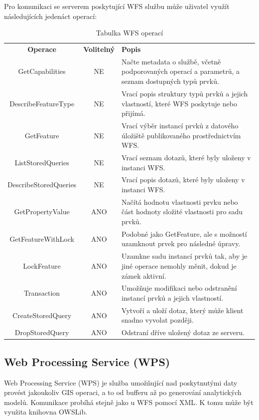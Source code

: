 \documentclass[a4paper,oneside,12pt]{book}
\begin{document}
\newpage
\hspace{10mm} Pro komunikaci se serverem poskytující WFS službu může uživatel využít následujících jedenáct operací:

\begin{table}[H]
  \centering
  \caption{Tabulka WFS operací} 
  \label{tab:WFS}
  \begin{tabular}{|c|c|p{7cm}|}
    \hline
    \textbf{Operace} & \textbf{Volitelný} & \textbf{Popis} \\
    \hhline{=|=|=}
    GetCapabilities & NE & Načte metadata o službě, včetně podporovaných operací a parametrů, a seznam dostupných typů prvků. \\
    \hline
    DescribeFeatureType & NE & Vrací popis struktury typů prvků a jejich vlastností, které WFS poskytuje nebo přijímá. \\
    \hline
    GetFeature & NE & Vrací výběr instancí prvků z datového úložiště publikovaného prostřednictvím WFS. \\
    \hline
    ListStoredQueries & NE & Vrací seznam dotazů, které byly uloženy v instanci WFS. \\
    \hline
    DescribeStoredQueries & NE & Vrací popis dotazů, které byly uloženy v instanci WFS. \\
    \hline
    GetPropertyValue & ANO & Načítá hodnotu vlastnosti prvku nebo část hodnoty složité vlastnosti pro sadu prvků. \\
    \hline
    GetFeatureWithLock & ANO & Podobné jako GetFeature, ale s možností uzamknout prvek pro následné úpravy. \\
    \hline
    LockFeature & ANO & Uzamkne sadu instancí prvků tak, aby je jiné operace nemohly měnit, dokud je zámek aktivní. \\
    \hline
    Transaction & ANO & Umožňuje modifikaci nebo odstranění instancí prvků a jejich vlastností. \\
    \hline
    CreateStoredQuery & ANO & Vytvoří a uloží dotaz, který může klient snadno vyvolat později. \\
    \hline
    DropStoredQuery & ANO & Odstraní dříve uložený dotaz ze serveru. \\
    \hline
  \end{tabular}
\end{table}

\subsection{Web Processing Service (WPS)} \label{wps}
\hspace{10mm}Web Processing Service (WPS) je služba umožňující nad poskytnutými daty provést jakoukoliv GIS operaci, a to od bufferu až po generování analytických modelů. Komunikace probíhá stejně jako u WFS pomocí XML. K tomu může být využita knihovna OWSLib.
\end{document}
